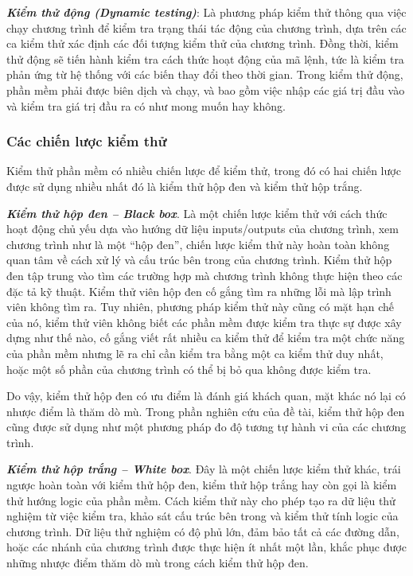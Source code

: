 \textbf{\textit{Kiểm thử động (Dynamic testing)}}: Là phương pháp kiểm thử thông qua việc chạy chương trình để kiểm tra trạng thái tác động của chương trình, dựa trên các ca kiểm thử xác định các đối tượng kiểm thử của chương trình. Đồng thời, kiểm thử động sẽ tiến hành kiểm tra cách thức hoạt động của mã lệnh, tức là kiểm tra phản ứng từ hệ thống với các biến thay đổi theo thời gian. Trong kiểm thử động, phần mềm phải được biên dịch và chạy, và bao gồm việc nhập các giá trị đầu vào và kiểm tra giá trị đầu ra có như mong muốn hay không.	
	
\subsubsection{Các chiến lược kiểm thử}
Kiểm thử phần mềm có nhiều chiến lược để kiểm thử, trong đó có hai chiến lược được sử dụng nhiều nhất đó là kiểm thử hộp đen và kiểm thử hộp trắng.
	
\textbf{\textit{Kiểm thử hộp đen – Black box}}. Là một chiến lược kiểm thử với cách thức hoạt động chủ yếu dựa vào hướng dữ liệu inputs/outputs của chương trình, xem chương trình như là một “hộp đen”, chiến lược kiểm thử này  hoàn toàn không quan tâm về cách xử lý và cấu trúc bên trong của chương trình. Kiểm thử hộp đen tập trung vào tìm các trường hợp mà chương trình không thực hiện theo các đặc tả kỹ thuật. Kiểm thử viên hộp đen cố gắng tìm ra những lỗi mà lập trình viên không tìm ra. Tuy nhiên, phương pháp kiểm thử này cũng có mặt hạn chế của nó, kiểm thử viên không biết các phần mềm được kiểm tra thực sự được xây dựng như thế nào, cố gắng viết rất nhiều ca kiểm thử để kiểm tra một chức năng của phần mềm nhưng lẽ ra chỉ cần kiểm tra bằng một ca kiểm thử duy nhất, hoặc một số phần của chương trình có thể bị bỏ qua không được kiểm tra.
		
Do vậy, kiểm thử hộp đen có ưu điểm là đánh giá khách quan, mặt khác nó lại có nhược điểm là thăm dò mù. Trong phần nghiên cứu của đề tài, kiểm thử hộp đen cũng được sử dụng như một phương pháp đo độ tương tự hành vi của các chương trình.
		
\textbf{\textit{Kiểm thử hộp trắng – White box}}. Đây là một chiến lược kiểm thử khác, trái ngược hoàn toàn với kiểm thử hộp đen, kiểm thử hộp trắng hay còn gọi là kiểm thử hướng logic của phần mềm. Cách kiểm thử này cho phép tạo ra dữ liệu thử nghiệm từ việc kiểm tra, khảo sát cấu trúc bên trong và kiểm thử tính logic của chương trình. Dữ liệu thử nghiệm có độ phủ lớn, đảm bảo tất cả các đường dẫn, hoặc các nhánh của chương trình được thực hiện ít nhất một lần, khắc phục được những nhược điểm thăm dò mù trong cách kiểm thử hộp đen.
		
